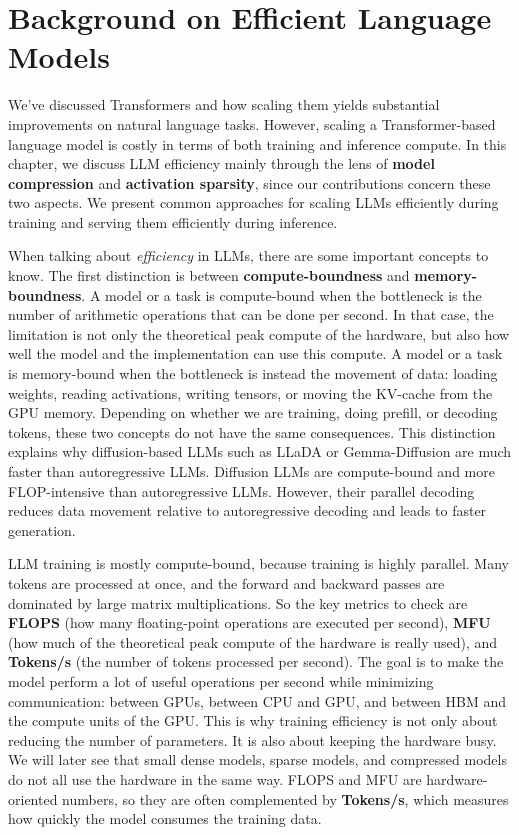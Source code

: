 \chapter{Background on Efficient Language Models}\label{ch:efficient_lm}
We've discussed Transformers and how scaling them yields substantial improvements on natural language tasks.
However, scaling a Transformer-based language model is costly in terms of both training and inference
compute. In this chapter, we discuss LLM efficiency mainly through the lens of \textbf{model compression} and \textbf{activation sparsity},
since our contributions concern these two aspects. 
We present common approaches for scaling LLMs efficiently during training
and serving them efficiently during inference.

When talking about \textit{efficiency} in LLMs, there are some important concepts to know. 
The first distinction is between \textbf{compute-boundness} and \textbf{memory-boundness}.
A model or a task is compute-bound when the bottleneck is the number of arithmetic operations
that can be done per second. In that case, the limitation is not only the theoretical
peak compute of the hardware, but also how well the model and the implementation can use this compute.
A model or a task is memory-bound when the bottleneck is instead the movement of data:
loading weights, reading activations, writing tensors, or moving the KV-cache from the GPU memory.
Depending on whether we are training, doing prefill, or decoding tokens, these two concepts
do not have the same consequences. This distinction explains why diffusion-based
LLMs such as LLaDA or Gemma-Diffusion are much faster than autoregressive LLMs.
Diffusion LLMs are compute-bound and more FLOP-intensive than autoregressive LLMs.
However, their parallel decoding reduces data movement relative to autoregressive decoding
and leads to faster generation.

LLM training is mostly compute-bound, because training is highly parallel. 
Many tokens are processed at once, and the forward and backward passes are dominated by large matrix multiplications.
So the key metrics to check are \textbf{FLOPS} (how many floating-point operations are executed per second),
\textbf{MFU} (how much of the theoretical peak compute of the hardware is really used),
and \textbf{Tokens/s} (the number of tokens processed per second).
The goal is to make the model perform a lot of useful operations per second while minimizing communication:
between GPUs, between CPU and GPU, and between HBM and the compute units of the GPU. 
This is why training efficiency is not only about reducing the number of parameters.
It is also about keeping the hardware busy. We will later see that small dense models, sparse models,
and compressed models do not all use the hardware in the same way. FLOPS and MFU
are hardware-oriented numbers, so they are often complemented by \textbf{Tokens/s}, which measures
how quickly the model consumes the training data.

